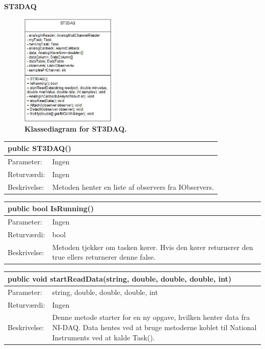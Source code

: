\textbf{ST3DAQ}
\begin{figure}[H]
\includegraphics[width =0.4\textwidth , center]{billeder/klassediagramdaq}
\caption{\textbf{Klassediagram for ST3DAQ.}}
\end{figure}
\begin{table}[H]
\label{tab:tabel2}
\begin{tabular}{| l | p{13cm} |}
   \hline
   \multicolumn{2}{|l|}{public ST3DAQ()} \\ \hline
   Parameter: & Ingen \\ \hline
   Returværdi: & Ingen\\ \hline
   Beskrivelse: &  Metoden henter en liste af observers fra IObservers.\\ \hline
\end{tabular}
\end{table}
\begin{table}[H]
\label{tab:tabel2}
\begin{tabular}{| l | p{13cm} |}
   \hline
   \multicolumn{2}{|l|}{public bool IsRunning()} \\ \hline
   Parameter: & Ingen \\ \hline
   Returværdi: & bool\\ \hline
   Beskrivelse: & Metoden tjekker om tasken kører. Hvis den kører returnerer den true ellers returnerer denne false. \\ \hline
\end{tabular}
\end{table}
\begin{table}[H]
\label{tab:tabel2}
\begin{tabular}{| l | p{13cm} |}
   \hline
   \multicolumn{2}{|l|}{public void startReadData(string, double, double, double, int)} \\ \hline
   Parameter: & string, double, double, double, int \\ \hline
   Returværdi: & Ingen\\ \hline
   Beskrivelse: & Denne metode starter for en ny opgave, hvilken henter data fra NI-DAQ. Data hentes ved at bruge metoderne koblet til National Instruments ved at kalde Task(). \\ \hline
\end{tabular}
\end{table}
